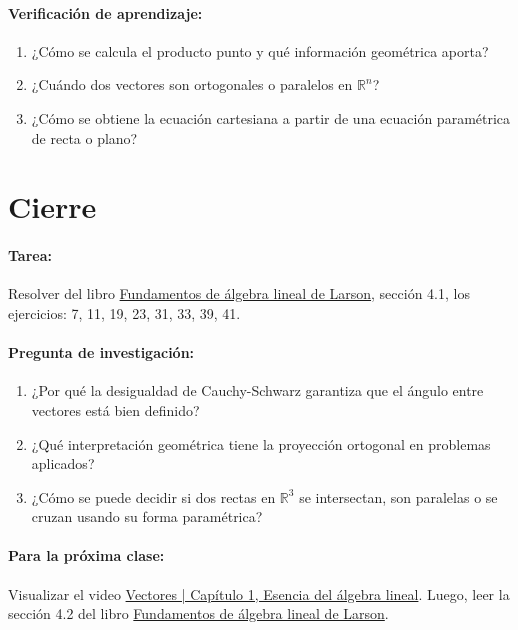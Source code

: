\documentclass[a4,11pt]{aleph-notas}
\begin{document}
\paragraph{Verificación de aprendizaje:}
\begin{enumerate}[leftmargin=*]
    \item ¿Cómo se calcula el producto punto y qué información geométrica aporta?
    \item ¿Cuándo dos vectores son ortogonales o paralelos en $\mathbb{R}^n$?
    \item ¿Cómo se obtiene la ecuación cartesiana a partir de una ecuación paramétrica de recta o plano?
\end{enumerate}

\section*{Cierre}

\paragraph{Tarea:}
Resolver del libro \href{https://catalogobiblioteca.puce.edu.ec/cgi-bin/koha/opac-detail.pl?biblionumber=86081}{Fundamentos de álgebra lineal de Larson}, sección 4.1, los ejercicios: 7, 11, 19, 23, 31, 33, 39, 41.

\paragraph{Pregunta de investigación:}
\begin{enumerate}[leftmargin=*]
    \item ¿Por qué la desigualdad de Cauchy-Schwarz garantiza que el ángulo entre vectores está bien definido?
    \item ¿Qué interpretación geométrica tiene la proyección ortogonal en problemas aplicados?
    \item ¿Cómo se puede decidir si dos rectas en $\mathbb{R}^3$ se intersectan, son paralelas o se cruzan usando su forma paramétrica?
\end{enumerate}

\paragraph{Para la próxima clase:}  
Visualizar el video \href{https://youtu.be/fNk_zzaMoSs?si=o7DzunwZHW_YP4lg}{Vectores | Capítulo 1, Esencia del álgebra lineal}. Luego, leer la sección 4.2 del libro \href{https://catalogobiblioteca.puce.edu.ec/cgi-bin/koha/opac-detail.pl?biblionumber=86081}{Fundamentos de álgebra lineal de Larson}.
\end{document}
